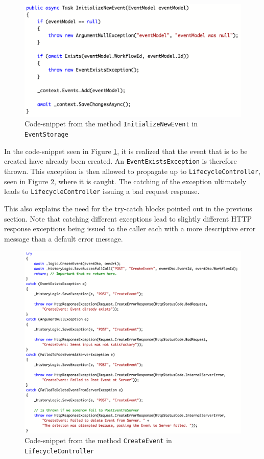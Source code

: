 \begin{figure}[h!]
\centering
\includegraphics[width=\linewidth]{figures/EventStorage2}
\caption{\label{fig:InitializeNewEvent}Code-snippet from the method \texttt{InitializeNewEvent} in \texttt{EventStorage}}
\end{figure}

In the code-snippet seen in Figure \ref{fig:InitializeNewEvent}, it is realized that the event that is to be created have already been created. An \texttt{EventExistsException} is therefore thrown. This exception is then allowed to propagate up to \texttt{LifecycleController}, seen in Figure \ref{fig:CreateEvent}, where it is caught. The catching of the exception ultimately leads to \texttt{LifecycleController} issuing a bad request response. 

This also explains the need for the try-catch blocks pointed out in the previous section.  Note that catching different exceptions lead to slightly different HTTP response exceptions being issued to the caller each with a more descriptive error message than a default error message.

\begin{figure}[h!]
\centering
\includegraphics[width=\linewidth]{figures/LifecycleController}
\caption{\label{fig:CreateEvent}Code-snippet from the method \texttt{CreateEvent} in \texttt{LifecycleController}}
\end{figure}


